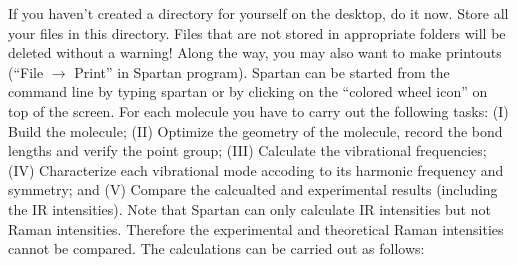 \documentclass[byrevtex,amssymb,aps,pra,floatfix,letterpaper]{revtex4}
\begin{document}
If you haven't created a directory for yourself on the desktop, do it now. Store all your files in this directory. Files that are not stored in appropriate folders will be deleted without a warning! Along the way, you may also want to make printouts (``File $\to$ Print'' in Spartan program). Spartan can be started from the command line by typing spartan or by clicking on the ``colored wheel icon'' on top of the screen. For each molecule you have to carry out the following tasks: (I) Build the molecule; (II) Optimize the geometry of the molecule, record the bond lengths and verify the point group; (III) Calculate the vibrational frequencies; (IV) Characterize each vibrational mode accoding to its harmonic frequency and symmetry; and (V) Compare the calcualted and experimental results (including the IR intensities). Note that Spartan can only calculate IR intensities but not Raman intensities. Therefore the experimental and theoretical Raman intensities cannot be compared. The calculations can be carried out as follows:
\end{document}
